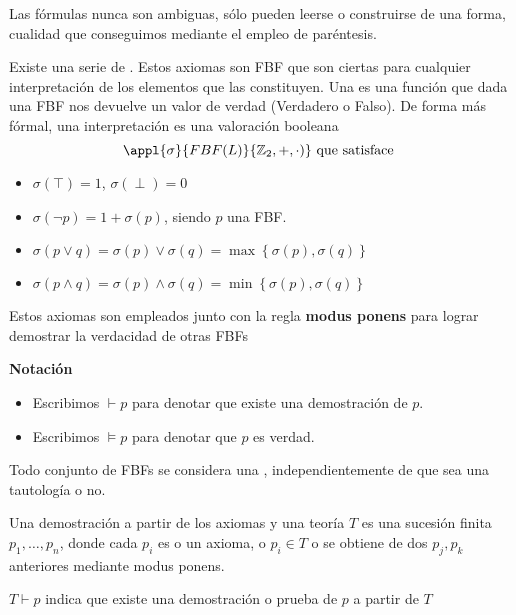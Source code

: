 \documentclass{apuntes}
\begin{document}
\begin{lemma}
Las fórmulas nunca son ambiguas, sólo pueden leerse o construirse de una forma, cualidad que conseguimos mediante el empleo de paréntesis.
\end{lemma}

Existe una serie de . Estos axiomas son FBF que son ciertas para cualquier interpretación de los elementos que las constituyen. Una  es una función que dada una FBF nos devuelve un valor de verdad (Verdadero o Falso). De forma más fórmal, una interpretación es una valoración booleana 
\[\appl{\sigma}{FBF(L)}{\mathbb{Z}_2, +, \cdot)} \text{ que satisface } \]

\begin{itemize}
	\item $\sigma(\top) = 1$, $\sigma(\perp) = 0$
	\item $\sigma(\neg p) = 1+\sigma(p)$,  siendo $p$ una FBF.
	\item $\sigma (p\vee q) = \sigma(p) \vee \sigma (q) = \max\left\{\sigma(p), \sigma(q)\right\}$
	\item $\sigma (p\wedge q) = \sigma(p) \wedge \sigma (q) = \min\left\{\sigma(p), \sigma(q)\right\}$
\end{itemize}

Estos axiomas son empleados junto con la regla \textbf{modus ponens} para lograr demostrar la verdacidad de otras FBFs

\begin{mdframed}
\textbf{Notación}
\begin{itemize}
	\vspace{-3mm}
	\item Escribimos $\vdash p$ para denotar que existe una demostración de $p$.
	\item Escribimos $\vDash p$ para denotar que $p$ es verdad.
\end{itemize}
\end{mdframed}

Todo conjunto de FBFs se considera una , independientemente de que sea una tautología o no.

\begin{defn}
	Una demostración a partir de los axiomas y una teoría $T$ es una sucesión finita $p_1, \hdots, p_n$, donde cada $p_i$ es o un axioma, o $p_i\in T$ o se obtiene de dos $p_j,p_k$ anteriores mediante modus ponens.

	$T \vdash p$ indica que existe una demostración o prueba de $p$ a partir de $T$
\end{defn}
\end{document}
